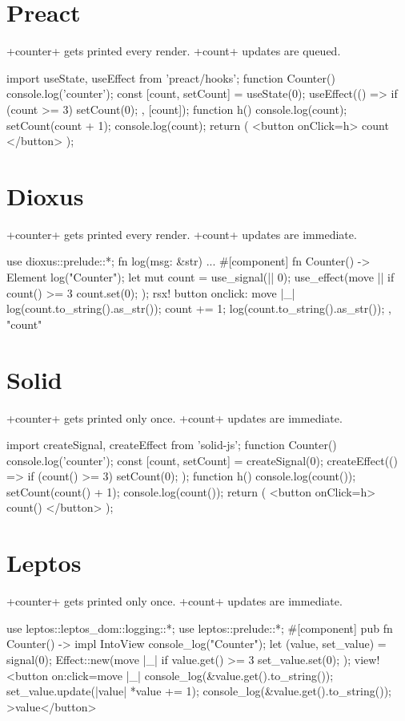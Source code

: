 \section{Preact}
+counter+ gets printed every render.
+count+ updates are queued.
\begin{reactcode}
import { useState, useEffect } from 'preact/hooks';
function Counter() {
  console.log('counter');
  const [count, setCount] = useState(0);
  useEffect(() => {
    if (count >= 3) {
      setCount(0);
    }
  }, [count]);
  function h() {
    console.log(count);
    setCount(count + 1);
    console.log(count);
  }
  return (
    <button onClick={h}>
      {count}
    </button>
  );
}
\end{reactcode}


\section{Dioxus}
+counter+ gets printed every render.
+count+ updates are immediate.
\begin{reactcode}
use dioxus::prelude::*;
fn log(msg: &str) { ... }
#[component]
fn Counter() -> Element {
  log("Counter");
  let mut count = use_signal(|| 0);
  use_effect(move || {
    if count() >= 3 {
      count.set(0);
    }
  });
  rsx! {
    button {
      onclick: move |_| {
        log(count.to_string().as_str());
        count += 1;
        log(count.to_string().as_str());
      },
      "{count}"
    }
  }
}
\end{reactcode}


\section{Solid}
+counter+ gets printed only once.
+count+ updates are immediate.
\begin{reactcode}
import { createSignal, createEffect } from 'solid-js';
function Counter() {
  console.log('counter');
  const [count, setCount] = createSignal(0);
  createEffect(() => {
    if (count() >= 3) {
      setCount(0);
    }
  });
  function h() {
    console.log(count());
    setCount(count() + 1);
    console.log(count());
  }
  return (
    <button onClick={h}>
      {count()}
    </button>
  );
}
\end{reactcode}


\section{Leptos}
+counter+ gets printed only once.
+count+ updates are immediate.
\begin{reactcode}
use leptos::leptos_dom::logging::*;
use leptos::prelude::*;
#[component]
pub fn Counter() -> impl IntoView {
  console_log("Counter");
  let (value, set_value) = signal(0);
  Effect::new(move |_| {
    if value.get() >= 3 {
      set_value.set(0);
    }
  });
  view! {
    <button on:click=move |_| {
      console_log(&value.get().to_string());
      set_value.update(|value| *value += 1);
      console_log(&value.get().to_string());
    }>{value}</button>
  }
}
\end{reactcode}


